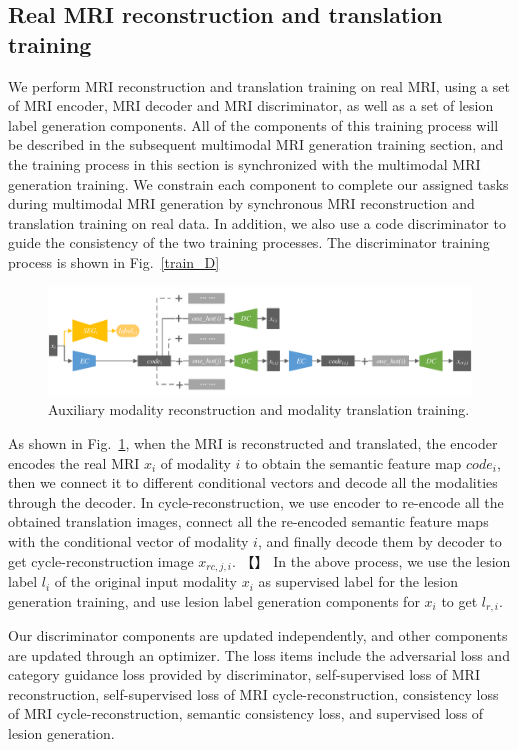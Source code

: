 \documentclass[letterpaper]{article} %
\begin{document}
\subsection{Real MRI reconstruction and translation training}
We perform MRI reconstruction and translation training on real MRI, using a set of MRI encoder, MRI decoder and MRI discriminator, as well as a set of lesion label generation components. All of the components of this training process will be described in the subsequent multimodal MRI generation training section, and the training process in this section is synchronized with the multimodal MRI generation training. We constrain each component to complete our assigned tasks during multimodal MRI generation by synchronous MRI reconstruction and translation training on real data. In addition, we also use a code discriminator to guide the consistency of the two training processes. The discriminator training process is shown in Fig.~\ref{train_D}

\begin{figure}
	\centering
	\includegraphics[width=0.98\columnwidth]{figures/trans_train}
	\caption{Auxiliary modality reconstruction and modality translation training.}
	\label{trans_train}
\end{figure}

As shown in Fig.~\ref{trans_train}, when the MRI is reconstructed and translated, the encoder encodes the real MRI $x_i$ of modality $i$ to obtain the semantic feature map $code_{i}$, then we connect it to different conditional vectors and decode all the modalities through the decoder. In cycle-reconstruction, we use encoder to re-encode all the obtained translation images, connect all the re-encoded semantic feature maps with the conditional vector of modality $i$, and finally decode them by decoder to get cycle-reconstruction image $x_{rc,j,i}$. 【】
In the above process, we use the lesion label $l_i$ of the original input modality $x_i$ as supervised label for the lesion generation training, and use lesion label generation components for $x_i$ to get $l_{r,i}$.

Our discriminator components are updated independently, and other components are updated through an optimizer. The loss items include the adversarial loss and category guidance loss provided by discriminator, self-supervised loss of MRI reconstruction, self-supervised loss of MRI cycle-reconstruction, consistency loss of MRI cycle-reconstruction, semantic consistency loss, and supervised loss of lesion generation. 
\end{document}
